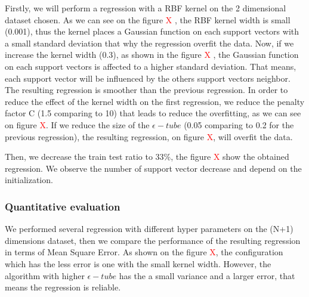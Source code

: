 Firstly, we will perform a regression with a RBF kernel on the 2 dimensional dataset chosen. As we can see on the figure \textcolor{red}{X}
, the RBF kernel width is small (0.001), thus the kernel places a Gaussian function on each support vectors with a small standard deviation that why the regression overfit the data. Now, if we increase the kernel width (0.3), as shown in the figure \textcolor{red}{X}
, the  Gaussian function on each support vectors is affected to a higher standard deviation. That means, each support vector will be influenced by the others support vectors neighbor. The resulting regression is smoother than the previous regression.
In order to reduce the effect of the kernel width on the first regression, we reduce the penalty factor C (1.5 comparing to 10) that leads to reduce the overfitting, as we can see on figure \textcolor{red}{X}.
If we reduce the size of the $\epsilon-tube$ (0.05 comparing to 0.2 for the previous regression), the resulting regression, on figure \textcolor{red}{X}, will overfit the data. 

Then, we decrease the train test ratio to 33\%, the figure \textcolor{red}{X} show the obtained regression. We observe the number of support vector decrease and depend on the initialization.

\subsubsection{Quantitative evaluation}

We performed several regression with different hyper parameters on the (N+1) dimensions dataset, then we compare the performance of the resulting regression in terms of Mean Square Error. 
As shown on the figure \textcolor{red}{X}, the configuration which has the less error is one with the small kernel width. However, the algorithm with higher $\epsilon-tube$ has the a small variance and a larger error, that means the regression is reliable.

